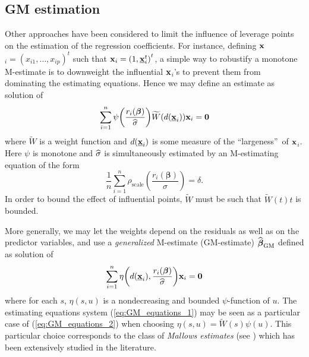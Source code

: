 \subsection{GM estimation}

Other approaches have been considered to limit the influence of leverage
points on the estimation of the regression coefficients. For instance,
defining \underline{$\mathbf x$}$_{i}=\left(  x_{i1},\ldots,x_{ip}\right)
^{t}$ such that $\stvec{x}_{i}=\left(  1,\underline{\stvec{x}}_{i}%
^{t}\right)  ^{t}$, a simple way to robustify a monotone M-estimate is to
downweight the influential \underline{$\mathbf x$}$_{i}$'s to prevent them
from dominating the estimating equations. Hence we may define an estimate as
solution of
\begin{equation}
\sum_{i=1}^{n}\psi\left(  \frac{r_{i}\left(  \boldsymbol\beta\right)
}{\sthat{\sigma}}\right)  \widetilde{W}(d(\underline{\stvec{x}}%
_{i}))\stvec{x}_{i}=\mathbf{0} \label{eq:GM_equations_1}%
\end{equation}
where $\widetilde{W}$ is a weight function and $d(\underline{\mathbf x}_{i})$
is some measure of the \textquotedblleft largeness\textquotedblright\ of
\underline{$\mathbf x$}$_{i}$. Here $\psi$ is monotone and $\widehat{\sigma}$
is simultaneously estimated by an M-estimating equation of the form
\[
\frac{1}{n}\sum_{i=1}^{n}\rho_{\mathrm{scale}}\left(  \frac{r_{i}\left(
\boldsymbol\beta\right)  }{\sigma}\right)  =\delta.
\]
In order to bound the effect of influential points, $\widetilde{W}$ must be
such that $\widetilde{W}(t)t$ is bounded.

More generally, we may let the weights depend on the residuals as well as on
the predictor variables, and use a \emph{generalized} M-estimate
(GM-estimate) $\widehat{\boldsymbol\beta}_{\mathrm{GM}}$ defined as solution
of
\begin{equation}
\sum_{i=1}^{n}\eta\left(  d(\underline{\stvec{x}}_{i}),\frac{r_{i}\left(
\boldsymbol\beta\right)  }{\sthat{\sigma}}\right)  \stvec{x}%
_{i}=\mathbf{0} \label{eq:GM_equations_2}%
\end{equation}
where for each $s$, $\eta\left(  s,u\right)  $ is a nondecreasing and bounded
$\psi$-function of $u$. The estimating equations system
(\ref{eq:GM_equations_1}) may be seen as a particular case of
(\ref{eq:GM_equations_2}) when choosing $\eta\left(  s,u\right)
=\widetilde{W}\left(  s\right)  \psi\left(  u\right)  $. This particular
choice corresponds to the class of \emph{Mallows estimates} (see
\citealp{Mallows:1975}) which has been extensively studied in the literature.

